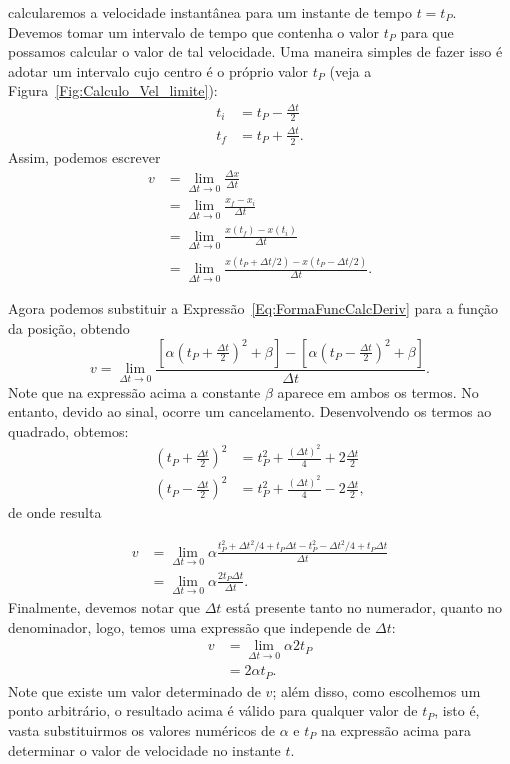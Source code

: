 \noindent{}calcularemos a velocidade instantânea para um instante de tempo $t = t_P$. Devemos tomar um intervalo de tempo que contenha o valor $t_P$ para que possamos calcular o valor de tal velocidade. Uma maneira simples de fazer isso é adotar um intervalo cujo centro é o próprio valor $t_P$ (veja a Figura~\ref{Fig:Calculo_Vel_limite}):
\begin{align}
    t_i &= t_P - \frac{\Delta t}{2} \\
    t_f &= t_P + \frac{\Delta t}{2}.
\end{align}
%
Assim, podemos escrever
\begin{align}
    v & = \lim_{\Delta t \to 0} \frac{\Delta x}{\Delta t} \\
    &= \lim_{\Delta t \to 0} \frac{x_f - x_i}{\Delta t} \\
    &= \lim_{\Delta t \to 0} \frac{x(t_f) - x(t_i)}{\Delta t} \\
    &= \lim_{\Delta t \to 0} \frac{x(t_P + \Delta t/2) - x(t_P-\Delta t / 2)}{\Delta t}.
\end{align}

Agora podemos substituir a Expressão~\eqref{Eq:FormaFuncCalcDeriv} para a função da posição, obtendo
\begin{equation}
    v = \lim_{\Delta t \to 0} \frac{\left[\alpha \left(t_P + \frac{\Delta t}{2}\right)^2 + \beta\right]-\left[\alpha \left(t_P - \frac{\Delta t}{2}\right)^2 + \beta\right]}{\Delta t}.
\end{equation}
%
Note que na expressão acima a constante $\beta$ aparece em ambos os termos. No entanto, devido ao sinal, ocorre um cancelamento. Desenvolvendo os termos ao quadrado, obtemos:
\begin{align}
    \left(t_P + \frac{\Delta t}{2}\right)^2 &= t_P^2 + \frac{(\Delta t)^2}{4} + 2\frac{\Delta t}{2} \\
    \left(t_P - \frac{\Delta t}{2}\right)^2 &= t_P^2 + \frac{(\Delta t)^2}{4} - 2\frac{\Delta t}{2},
\end{align}
%
de onde resulta

\begin{align}
    v &= \lim_{\Delta t \to 0} \alpha\frac{t_P^2 + \Delta t^2/4 + t_P\Delta t - t_P^2 - \Delta t^2/4 + t_P\Delta t}{\Delta t} \\
    &= \lim_{\Delta t \to 0} \alpha\frac{2 t_P\Delta t}{\Delta t}.
\end{align}
%
Finalmente, devemos notar que $\Delta t$ está presente tanto no numerador, quanto no denominador, logo, temos uma expressão que independe de $\Delta t$:
\begin{align}
    v &=  \lim_{\Delta t \to 0} \alpha 2 t_P \\
    &= 2 \alpha t_P.
\end{align}
%
Note que existe um valor determinado de $v$; além disso, como escolhemos um ponto arbitrário, o resultado acima é válido para qualquer valor de $t_P$, isto é, vasta substituirmos os valores numéricos de $\alpha$ e $t_P$ na expressão acima para determinar o valor de velocidade no instante $t$.

